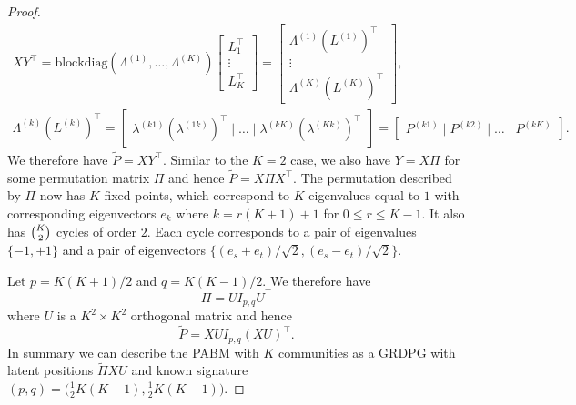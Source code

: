 \documentclass[
  11pt,
]{article}
\theoremstyle{definition}
\theoremstyle{definition}
\theoremstyle{definition}
\theoremstyle{definition}
\theoremstyle{remark}
\begin{document}
\begin{proof}
\begin{gather*}
  XY^{\top} = \mathrm{blockdiag}(\Lambda^{(1)}, \dots,
\Lambda^{(K)}) \begin{bmatrix} L_1^{\top} \\ \vdots \\
  L_{K}^{\top} \end{bmatrix} = \begin{bmatrix} \Lambda^{(1)}
  (L^{(1)})^{\top} \\ \vdots \\
  \Lambda^{(K)} (L^{(K)})^{\top} \end{bmatrix}, \\
\Lambda^{(k)} (L^{(k)})^{\top} = \begin{bmatrix} \lambda^{(k1)}
  (\lambda^{(1k)})^{\top} \mid \dots \mid \lambda^{(kK)}
  (\lambda^{(Kk)})^{\top} \end{bmatrix} = \begin{bmatrix} P^{(k1)}
  \mid P^{(k2)} \mid \dots \mid P^{(kK)} \end{bmatrix}.
\end{gather*}
We therefore have $\tilde{P} = X Y^\top$. 
Similar to the $K = 2$ case, we also have $Y = X \Pi$ for some permutation matrix
$\Pi$ and hence $\tilde{P} = X \Pi X^\top$.
The permutation described by $\Pi$ now has $K$ fixed points, which correspond to
$K$ eigenvalues equal to $1$ with corresponding eigenvectors $e_k$ where
$k = r (K + 1) + 1$ for $0 \leq r \leq K - 1$. It also has
$\tbinom{K}{2}$ cycles of order $2$. Each cycle corresponds to
a pair of eigenvalues $\{-1,+1\}$ and a pair of eigenvectors
$\{(e_s + e_t)/\sqrt{2},(e_s - e_t)/ \sqrt{2}\}$. 

Let $p = K (K + 1) / 2$ and $q = K (K - 1) / 2$. 
We therefore have
\begin{equation} \label{eq:permutation}
\Pi = U I_{p,q} U^\top
\end{equation}
where $U$ is a $K^2 \times K^2$ orthogonal matrix and hence
\begin{equation} \label{eq:pabm-grdpg}
\tilde{P} = X U I_{p, q} (X U)^\top.
\end{equation}
In summary we can describe the PABM with $K$ communities as a GRDPG with latent
positions $\tilde{\Pi} X U$ and known signature $(p,q) = \bigl( \tfrac{1}{2} K (K + 1) ,
\tfrac{1}{2} K (K - 1)\bigr)$.
\end{proof}
\end{document}
